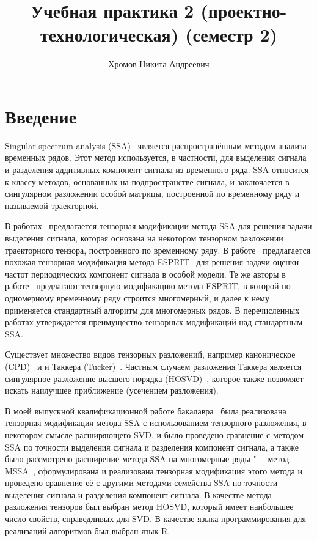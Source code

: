 \documentclass[specialist,
  substylefile=spbu_report.rtx,
subf,href,colorlinks=true, 12pt]{disser}
\theoremstyle{plain}
\theoremstyle{definition}
\theoremstyle{remark}
\begin{document}
\title{Учебная практика 2 (проектно-технологическая) (семестр 2)}
\author{Хромов Никита Андреевич}
\date{\number\year}
\maketitle

\tableofcontents

\section{Введение}\label{sec:intro}
Singular spectrum analysis (SSA)~\cite{ssa} является
распространённым методом анализа временных рядов.
Этот метод используется, в частности, для выделения сигнала и
разделения аддитивных компонент сигнала из
временного ряда.
SSA относится к классу методов, основанных на подпространстве
сигнала, и заключается в сингулярном разложении
особой матрицы, построенной по временному ряду и называемой траекторной.

В работах~\cite{TSSA, TSSA-improved} предлагается тензорная
модификации метода SSA для решения
задачи выделения сигнала, которая основана на некотором тензорном
разложении траекторного тензора,
построенного по временному ряду.
В работе~\cite{hosvd-hooi-separation} предлагается похожая
тензорная модификация
метода ESPRIT~\cite{esprit} для решения задачи оценки частот
периодических компонент сигнала
в особой модели.
Те же авторы в работе~\cite{Papy2009} предлагают тензорную модификацию метода
ESPRIT, в которой по одномерному временному ряду строится многомерный, и
далее к нему применяется стандартный алгоритм для многомерных рядов.
В перечисленных работах утверждается преимущество тензорных
модификаций над стандартным SSA\@.

Существует множество видов тензорных разложений, например
каноническое \linebreak (CPD)~\cite{parafac1, parafac2} и
и Таккера (Tucker)~\cite{tucker}. Частным случаем разложения
Таккера является сингулярное
разложение высшего порядка (HOSVD)~\cite{hosvd}, которое также
позволяет искать наилучшее приближение
(усечением разложения).

В моей выпускной квалификационной работе бакалавра~\cite{Thesis2024} была
реализована тензорная модификация
метода SSA с использованием тензорного разложения, в некотором
смысле расширяющего SVD,
и было проведено сравнение с методом SSA по точности выделения
сигнала и разделения
компонент сигнала, а также было рассмотрено
расширение метода SSA на многомерные ряды "--- метод
MSSA~\cite{ssa-2020},
сформулирована и реализована тензорная модификация этого метода и
проведено сравнение её с другими методами
семейства SSA по точности выделения сигнала и разделения компонент сигнала.
В качестве метода разложения тензоров был выбран метод HOSVD, который имеет
наибольшее число
свойств, справедливых для SVD.
В качестве языка программирования для реализаций алгоритмов был выбран язык R.
\end{document}
